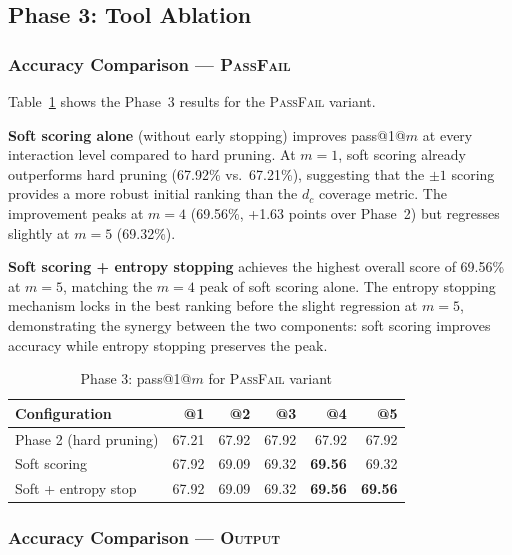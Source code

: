 \documentclass[conference]{IEEEtran}
\begin{document}
\subsection{Phase 3: Tool Ablation}

\subsubsection{Accuracy Comparison --- \textsc{PassFail}}

Table~\ref{tab:phase3_passfail} shows the Phase~3 results for the \textsc{PassFail} variant.

\textbf{Soft scoring alone} (without early stopping) improves pass@1@$m$ at every interaction level compared to hard pruning. At $m=1$, soft scoring already outperforms hard pruning (67.92\% vs.\ 67.21\%), suggesting that the $\pm 1$ scoring provides a more robust initial ranking than the $d_c$ coverage metric. The improvement peaks at $m=4$ (69.56\%, +1.63 points over Phase~2) but regresses slightly at $m=5$ (69.32\%).

\textbf{Soft scoring + entropy stopping} achieves the highest overall score of 69.56\% at $m=5$, matching the $m=4$ peak of soft scoring alone. The entropy stopping mechanism locks in the best ranking before the slight regression at $m=5$, demonstrating the synergy between the two components: soft scoring improves accuracy while entropy stopping preserves the peak.

\begin{table}[t]
\centering
\caption{Phase 3: pass@1@$m$ for \textsc{PassFail} variant}
\label{tab:phase3_passfail}
\begin{tabular}{lrrrrr}
\toprule
\textbf{Configuration} & \textbf{@1} & \textbf{@2} & \textbf{@3} & \textbf{@4} & \textbf{@5} \\
\midrule
Phase 2 (hard pruning) & 67.21 & 67.92 & 67.92 & 67.92 & 67.92 \\
Soft scoring & 67.92 & 69.09 & 69.32 & \textbf{69.56} & 69.32 \\
Soft + entropy stop & 67.92 & 69.09 & 69.32 & \textbf{69.56} & \textbf{69.56} \\
\bottomrule
\end{tabular}
\end{table}

\subsubsection{Accuracy Comparison --- \textsc{Output}}
\end{document}
